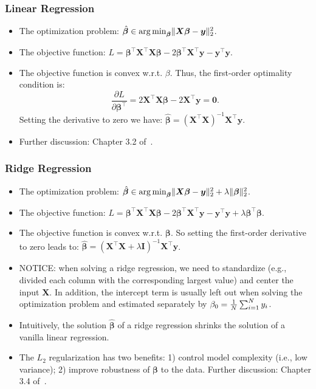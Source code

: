    \subsubsection{Linear Regression}\label{ML:linear-regression}
        \begin{itemize}
            \item The optimization problem: $\hat{\bm{\beta}} \in \operatorname{arg\,min}_{\bm{\beta}} \lVert\bm{X} \bm{\beta} - \bm{y}\rVert_2^2$.
            \item The objective function: $L = \bm{\beta}^\top \bm{X}^\top \bm{X} \bm{\beta} - 2 \bm{\beta}^\top \bm{X}^\top \bm{y} - \bm{y}^\top \bm{y}$.
            \item The objective function is convex w.r.t. $\beta$. Thus, the first-order optimality condition is: 
                \begin{equation}
                    \frac{\partial L}{\partial \bm{\beta}^\top} =  2 \bm{X}^\top \bm{X} \bm{\beta} - 2\bm{X}^\top \bm{y} = \bm{0}.
                \end{equation}
            Setting the derivative to zero we have: $\hat{\bm{\beta}} = (\bm{X}^\top \bm{X})^{-1} \bm{X}^\top \bm{y}$.
            \item Further discussion: Chapter 3.2 of~\cite{hastie2009elements}.
        \end{itemize}
    
    \subsubsection{Ridge Regression}
        \begin{itemize}
            \item The optimization problem: $\hat{\bm{\beta}} \in \operatorname{arg\,min}_{\bm{\beta}} \lVert\bm{X} \bm{\beta} - \bm{y}\rVert_2^2 + \lambda\lVert\bm{\beta}\rVert_2^2$.
            \item The objective function: $L = \bm{\beta}^\top \bm{X}^\top \bm{X} \bm{\beta} - 2 \bm{\beta}^\top \bm{X}^\top \bm{y} - \bm{y}^\top \bm{y} + \lambda \bm{\beta}^\top \bm{\beta}$.
            \item The objective function is convex w.r.t. $\bm{\beta}$. So setting the first-order derivative to zero leads to: $\hat{\bm{\beta}} = (\bm{X}^\top \bm{X} + \lambda \bm{I})^{-1} \bm{X}^\top \bm{y}$.
            \item NOTICE: when solving a ridge regression, we need to standardize (e.g., divided each column with the corresponding largest value)  and center the input $\bm{X}$. In addition, the intercept term is usually left out when solving the optimization problem and estimated separately by $\beta_0 = \frac{1}{N}\sum_{i=1}^{N}{y_i}$.
            \item Intuitively, the solution $\hat{\bm{\beta}}$ of a ridge regression shrinks the solution of a vanilla linear regression.
            \item The $L_2$ regularization has two benefits: 1) control model complexity (i.e., low variance); 2) improve robustness of $\bm{\beta}$ to the data. Further discussion: Chapter 3.4 of~\cite{hastie2009elements}.
        \end{itemize}
        
